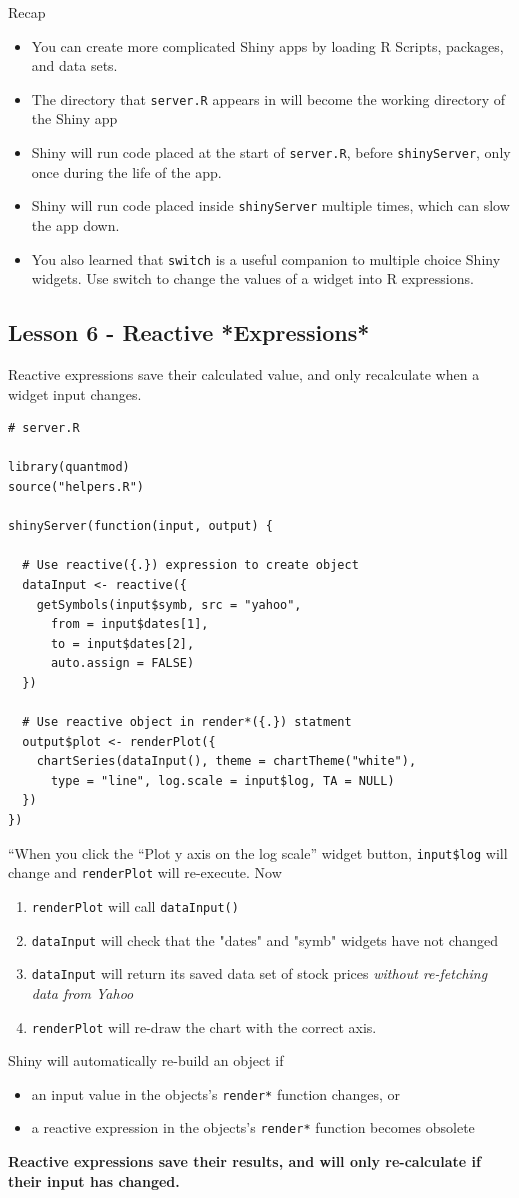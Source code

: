 \documentclass{article}
\begin{document}
Recap
\begin{itemize}
\item You can create more complicated Shiny apps by loading R Scripts, packages, and data sets.
\item The directory that \verb|server.R| appears in will become the working directory of the Shiny app
\item Shiny will run code placed at the start of \verb|server.R|, before \verb|shinyServer|, only once during the life of the app.
\item Shiny will run code placed inside \verb|shinyServer| multiple times, which can slow the app down.
\item You also learned that \verb|switch| is a useful companion to multiple choice Shiny widgets. Use switch to change the values of a widget into R expressions.
\end{itemize}

\subsection*{Lesson 6 - Reactive *Expressions*}
Reactive expressions save their calculated value, and only recalculate when a widget input changes.
\begin{verbatim}
# server.R

library(quantmod)
source("helpers.R")

shinyServer(function(input, output) {

  # Use reactive({.}) expression to create object
  dataInput <- reactive({
    getSymbols(input$symb, src = "yahoo", 
      from = input$dates[1],
      to = input$dates[2],
      auto.assign = FALSE)
  })
  
  # Use reactive object in render*({.}) statment
  output$plot <- renderPlot({    
    chartSeries(dataInput(), theme = chartTheme("white"), 
      type = "line", log.scale = input$log, TA = NULL)
  })
})
\end{verbatim}
``When you click the “Plot y axis on the log scale” widget button, \verb|input$log| will change and \verb|renderPlot| will re-execute. Now
      \begin{enumerate}
      \item \verb|renderPlot| will call \verb|dataInput()|
      \item \verb|dataInput| will check that the "dates" and "symb" widgets have not changed
      \item \verb|dataInput| will return its saved data set of stock prices {\it without re-fetching data from Yahoo}
      \item \verb|renderPlot| will re-draw the chart with the correct axis.
      \end{enumerate}
Shiny will automatically re-build an object if
\begin{itemize}
\item an input value in the objects's \verb|render*| function changes, or
\item a reactive expression in the objects's \verb|render*| function becomes obsolete
\end{itemize}
{\bf Reactive expressions save their results, and will only re-calculate if their input has changed.}
\end{document}
